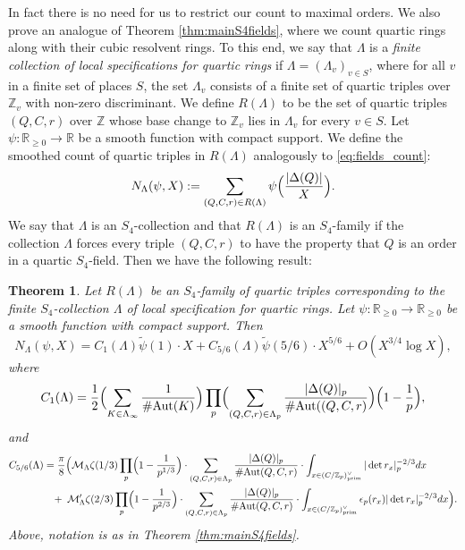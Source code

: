 \documentclass{article}
\def\Z{{\mathbb Z}}
\def\Aut{{\rm Aut}}
\def\prim{{\rm prim}}
\def\R{{\mathbb R}}
\def\Z{{\mathbb Z}}
\def\wt{\widetilde}
\newtheorem{Theorem}{Theorem}
\begin{document}
In fact there is no need for us to restrict our count to maximal orders. We also prove an analogue of Theorem \ref{thm:mainS4fields}, where we count quartic rings along with their cubic resolvent rings. To this end, we say that $\Lambda$ is a {\it finite collection of local specifications for quartic rings} if $\Lambda=(\Lambda_v)_{v\in S}$, where for all $v$ in a finite set of places $S$, the set $\Lambda_v$ consists of a finite set of quartic triples over $\Z_v$ with non-zero discriminant. We define $R(\Lambda)$ to be the set of quartic triples $(Q,C,r)$ over $\Z$ whose base change to $\Z_v$ lies in $\Lambda_v$ for every $v\in S$. Let $\psi:\R_{\geq 0}\to\R$ be a smooth function with compact support. We define the smoothed count of quartic triples in $R(\Lambda)$ analogously to \eqref{eq:fields_count}:
\begin{equation}\label{eq:rings_count}
N_{\Lambda}(\psi,X):=\sum_{(Q,C,r)\in R(\Lambda)}\psi\Bigl(\frac{|\Delta(Q)|}{X}\Bigr).
\end{equation}
We say that $\Lambda$ is an $S_4$-collection and that $R(\Lambda)$ is an $S_4$-family if the collection $\Lambda$ forces every triple $(Q,C,r)$ to have the property that $Q$ is an order in a quartic $S_4$-field. Then we have the following result:

\begin{Theorem}\label{thm:mainS4rings}
Let $R(\Lambda)$ be an $S_4$-family of quartic triples corresponding to the finite $S_4$-collection $\Lambda$ of local specification for quartic rings. Let $\psi:\R_{\geq 0}\to\R_{\geq 0}$ be a smooth function with compact support. Then 
\begin{equation*}
N_{\Lambda}(\psi,X)=C_1(\Lambda)\wt{\psi}(1)\cdot X+ C_{5/6}(\Lambda)\wt{\psi}(5/6)\cdot X^{5/6} + O(X^{3/4}\log X),
\end{equation*}
where
\begin{equation*}\label{eq:leadingcons}
C_1(\Lambda)=\frac{1}{2}\Bigl(\sum_{K\in\Lambda_\infty}\frac{1}{\#\Aut(K)}\Bigr)\prod_p
\Bigl(\sum_{(Q,C,r)\in\Lambda_p}\frac{|\Delta(Q)|_p}{\#\Aut((Q,C,r)}\Bigr)\Bigl(1-\frac{1}{p}\Bigr),
\end{equation*} and
\begin{align*}\label{eq:secondcons}    
C_{5/6}(\Lambda)&=\frac{\pi}{8}\Bigl(\mathcal M_\Lambda\zeta(1/3)\prod_{p}\Bigl(1-\frac{1}{p^{1/3}}\Bigr)\cdot\sum_{(Q,C,r)\in\Lambda_p}\frac{|\Delta(Q)|_p}{\#\Aut(Q,C,r)}\cdot \int_{x\in (C/\Z_p)^{\vee}_{\prim}}  |\det{r_x}|_p^{-2/3}dx \\&\;\;\;+\; \mathcal M_\Lambda'\zeta(2/3)\prod_{p}\Bigl(1-\frac{1}{p^{2/3}}\Bigr)\cdot\sum_{(Q,C,r)\in\Lambda_p}\frac{|\Delta(Q)|_p}{\#\Aut(Q,C,r)}\cdot \int_{x\in (C/\Z_p)^{\vee}_{\prim}}  \epsilon_p(r_x)|\det{r_x}|_p^{-2/3}dx\Bigr).
\end{align*}
Above, notation is as in Theorem \ref{thm:mainS4fields}.
\end{Theorem}
\end{document}
